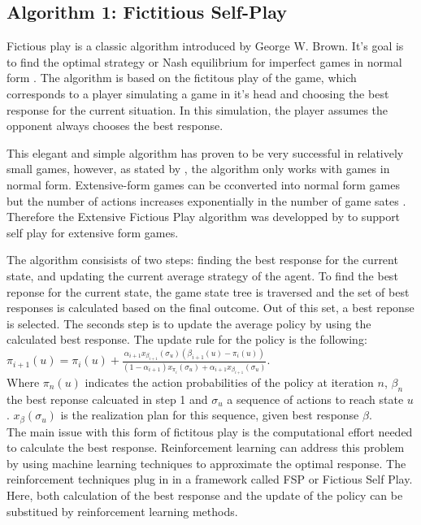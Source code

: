 \documentclass[10pt,a4paper]{article}
\begin{document}
\subsection{Algorithm 1: Fictitious Self-Play}
\label{sub:xfsp}
Fictious play is a classic algorithm introduced by George W. Brown. It's goal is to find the optimal strategy or Nash equilibrium for imperfect games in normal form \cite{MCFSP}. The algorithm is based on the fictitous play of the game, which corresponds to a player simulating a game in it's head and choosing the best response for the current situation. In this simulation, the player assumes the opponent always chooses the best response.

This elegant and simple algorithm has proven to be very successful in relatively small games, however, as stated by \cite{fsp-ext}, the algorithm only works with games in normal form. Extensive-form games can be cconverted into normal form games but the number of actions increases exponentially in the number of game sates \cite{fsp-ext}.
Therefore the Extensive Fictious Play algorithm was developped by \cite{fsp-ext} to support self play for extensive form games.

The algorithm consisists of two steps: finding the best response for the current state, and updating the current average strategy of the agent.
To find the best reponse for the current state, the game state tree is traversed and the set of best responses is calculated based on the final outcome. Out of this set, a best reponse is selected.
The seconds step is to update the average policy by using the calculated best response. The update rule for the policy is the following:
\begin{math}
\pi_{i+1}(u) = \pi_{i}(u) + \frac{\alpha_{i+1}x_{\beta_{i+1}}(\sigma_{u})(\beta_{i+1}(u) - \pi_i(u))}{(1-\alpha_{i+1})x_{\pi_i}(\sigma_{u}) + \alpha_{i+1}x_{\beta_{i+1}}(\sigma_u)}
\end{math}.\\
Where $\pi_n(u)$ indicates the action probabilities of the policy at iteration $n$, $\beta_n$ the best reponse calcuated in step 1 and $\sigma_{u}$ a sequence of actions to reach state $u$. $x_{\beta}(\sigma_u)$ is the realization plan for this sequence, given best response $\beta$.\\
The main issue with this form of fictitous play is the computational effort needed to calculate the best response. 
Reinforcement learning can address this problem by using machine learning techniques to approximate the optimal response.
The reinforcement techniques plug in in a framework called FSP or Fictious Self Play. Here, both calculation of the best response and the update of the policy can be substitued by reinforcement learning methods.
\end{document}
